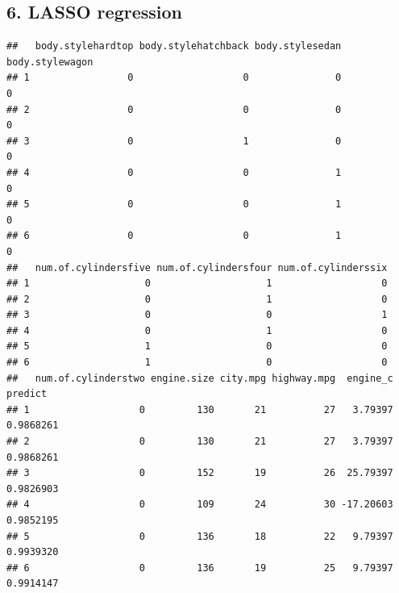 \documentclass[]{article}
\newenvironment{Shaded}{\begin{snugshade}}{\end{snugshade}}
\newcommand{\KeywordTok}[1]{\textcolor[rgb]{0.13,0.29,0.53}{\textbf{#1}}}
\newcommand{\DataTypeTok}[1]{\textcolor[rgb]{0.13,0.29,0.53}{#1}}
\newcommand{\DecValTok}[1]{\textcolor[rgb]{0.00,0.00,0.81}{#1}}
\newcommand{\StringTok}[1]{\textcolor[rgb]{0.31,0.60,0.02}{#1}}
\newcommand{\OperatorTok}[1]{\textcolor[rgb]{0.81,0.36,0.00}{\textbf{#1}}}
\newcommand{\NormalTok}[1]{#1}
\begin{document}
\subsection{6. LASSO regression}\label{lasso-regression}

\begin{Shaded}
\end{Shaded}

\begin{verbatim}
##   body.stylehardtop body.stylehatchback body.stylesedan body.stylewagon
## 1                 0                   0               0               0
## 2                 0                   0               0               0
## 3                 0                   1               0               0
## 4                 0                   0               1               0
## 5                 0                   0               1               0
## 6                 0                   0               1               0
##   num.of.cylindersfive num.of.cylindersfour num.of.cylinderssix
## 1                    0                    1                   0
## 2                    0                    1                   0
## 3                    0                    0                   1
## 4                    0                    1                   0
## 5                    1                    0                   0
## 6                    1                    0                   0
##   num.of.cylinderstwo engine.size city.mpg highway.mpg  engine_c   predict
## 1                   0         130       21          27   3.79397 0.9868261
## 2                   0         130       21          27   3.79397 0.9868261
## 3                   0         152       19          26  25.79397 0.9826903
## 4                   0         109       24          30 -17.20603 0.9852195
## 5                   0         136       18          22   9.79397 0.9939320
## 6                   0         136       19          25   9.79397 0.9914147
\end{verbatim}
\end{document}
